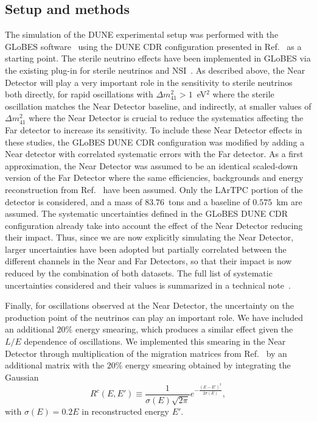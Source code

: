 \subsection{Setup and methods}
The simulation of the DUNE experimental setup was performed with the GLoBES software~\cite{Huber:2004ka,Huber:2007ji} using the DUNE CDR configuration presented in Ref.~\cite{Alion:2016uaj} as a starting point. The sterile neutrino effects have been implemented in GLoBES via the existing plug-in for sterile neutrinos and NSI~\cite{Joachim}. As described above, the Near Detector will play a very important role in the sensitivity to sterile neutrinos both directly, for rapid oscillations with $\Delta m_{41}^2 > 1$~eV$^2$ where the sterile oscillation matches the Near Detector baseline, and indirectly, at smaller values of $\Delta m_{41}^2$ where the Near Detector is crucial to reduce the systematics affecting the Far detector to increase its sensitivity. To include these Near Detector effects in these studies, the GLoBES DUNE CDR configuration was modified by adding a Near detector with correlated systematic errors with the Far detector. As a first approximation, the Near Detector was assumed to be an identical scaled-down version of the Far Detector where the same efficiencies, backgrounds and energy reconstruction from Ref.~\cite{Alion:2016uaj} have been assumed. Only the LArTPC portion of the detector is considered, and a mass of $83.76$~tons and a baseline of $0.575$~km are assumed. The systematic uncertainties defined in the GLoBES DUNE CDR configuration already take into account the effect of the Near Detector reducing their impact. Thus, since we are now explicitly simulating the Near Detector, larger uncertainties have been adopted but partially correlated between the different channels in the Near and Far Detectors, so that their impact is now reduced by the combination of both datasets. The full list of systematic uncertainties considered and their values is summarized in a technical note~\cite{ref:dune-sterile-note}.

Finally, for oscillations observed at the Near Detector, the uncertainty on the production point of the neutrinos can play an important role. We have included an additional $20\%$ energy smearing, which produces a similar effect given the $L/E$ dependence of oscillations. We implemented this smearing in the Near Detector through multiplication of the migration matrices from Ref.~\cite{Alion:2016uaj} by an additional matrix with the $20\%$ energy smearing obtained by integrating the Gaussian
\begin{equation}
R^c(E,E')\equiv\frac{1}{\sigma(E)\sqrt{2\pi}}e^{-\frac{(E-E')^2}{2\sigma(E)}},
\label{R_mat}
\end{equation}
with $\sigma(E)=0.2 E$ in reconstructed energy $E'$.

